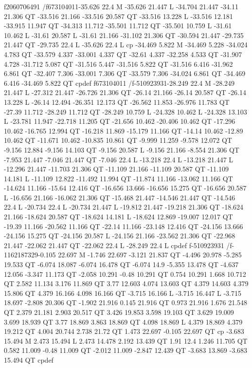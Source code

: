 f2060706491
/f673104011{-35.626 22.4 M
-35.626 21.447 L
-34.704 21.447 -34.11 21.306 QT
-33.516 21.166 -33.516 20.587 QT
-33.516 13.228 L
-33.516 12.181 -33.915 11.947 QT
-34.313 11.712 -35.501 11.712 QT
-35.501 10.759 L
-31.61 10.462 L
-31.61 20.587 L
-31.61 21.166 -31.102 21.306 QT
-30.594 21.447 -29.735 21.447 QT
-29.735 22.4 L
-35.626 22.4 L
cp
-34.469 5.822 M
-34.469 5.228 -34.024 4.783 QT
-33.579 4.337 -33.001 4.337 QT
-32.61 4.337 -32.258 4.533 QT
-31.907 4.728 -31.712 5.087 QT
-31.516 5.447 -31.516 5.822 QT
-31.516 6.416 -31.962 6.861 QT
-32.407 7.306 -33.001 7.306 QT
-33.579 7.306 -34.024 6.861 QT
-34.469 6.416 -34.469 5.822 QT
cp}def
f673104011
/f-510923931{-28.249 22.4 M
-28.249 21.447 L
-27.312 21.447 -26.726 21.306 QT
-26.14 21.166 -26.14 20.587 QT
-26.14 13.228 L
-26.14 12.494 -26.351 12.173 QT
-26.562 11.853 -26.976 11.783 QT
-27.39 11.712 -28.249 11.712 QT
-28.249 10.759 L
-24.328 10.462 L
-24.328 13.103 L
-23.781 11.947 -22.718 11.205 QT
-21.656 10.462 -20.406 10.462 QT
-17.296 10.462 -16.765 12.994 QT
-16.218 11.869 -15.179 11.166 QT
-14.14 10.462 -12.89 10.462 QT
-11.671 10.462 -10.835 10.861 QT
-9.999 11.259 -9.578 12.072 QT
-9.156 12.884 -9.156 14.103 QT
-9.156 20.587 L
-9.156 21.166 -8.554 21.306 QT
-7.953 21.447 -7.046 21.447 QT
-7.046 22.4 L
-13.218 22.4 L
-13.218 21.447 L
-12.296 21.447 -11.703 21.306 QT
-11.109 21.166 -11.109 20.587 QT
-11.109 14.181 L
-11.109 12.822 -11.492 11.994 QT
-11.874 11.166 -13.062 11.166 QT
-14.624 11.166 -15.64 12.416 QT
-16.656 13.666 -16.656 15.275 QT
-16.656 20.587 L
-16.656 21.166 -16.062 21.306 QT
-15.468 21.447 -14.546 21.447 QT
-14.546 22.4 L
-20.734 22.4 L
-20.734 21.447 L
-19.812 21.447 -19.218 21.306 QT
-18.624 21.166 -18.624 20.587 QT
-18.624 14.181 L
-18.624 12.869 -19.007 12.017 QT
-19.39 11.166 -20.562 11.166 QT
-22.14 11.166 -23.148 12.416 QT
-24.156 13.666 -24.156 15.275 QT
-24.156 20.587 L
-24.156 21.166 -23.562 21.306 QT
-22.968 21.447 -22.062 21.447 QT
-22.062 22.4 L
-28.249 22.4 L
cp}def
f-510923931
/f-1162187329{-0.105 22.697 M
-1.746 22.697 -3.121 21.837 QT
-4.496 20.978 -5.285 19.533 QT
-6.074 18.087 -6.074 16.478 QT
-6.074 14.9 -5.355 13.478 QT
-4.637 12.056 -3.347 11.173 QT
-2.058 10.291 -0.48 10.291 QT
0.754 10.291 1.668 10.712 QT
2.582 11.134 3.176 11.869 QT
3.77 12.603 4.074 13.603 QT
4.379 14.603 4.379 15.806 QT
4.379 16.166 4.098 16.166 QT
-3.715 16.166 L
-3.715 16.447 L
-3.715 18.697 -2.808 20.306 QT
-1.902 21.916 0.145 21.916 QT
0.973 21.916 1.676 21.548 QT
2.379 21.181 2.903 20.517 QT
3.426 19.853 3.598 19.103 QT
3.629 19.009 3.699 18.939 QT
3.77 18.869 3.863 18.869 QT
4.098 18.869 L
4.379 18.869 4.379 19.212 QT
4.004 20.744 2.738 21.72 QT
1.473 22.697 -0.105 22.697 QT
cp
-3.683 15.494 M
2.473 15.494 L
2.473 14.478 2.192 13.439 QT
1.91 12.4 1.246 11.705 QT
0.582 11.009 -0.48 11.009 QT
-2.012 11.009 -2.847 12.439 QT
-3.683 13.869 -3.683 15.494 QT
cp}def

